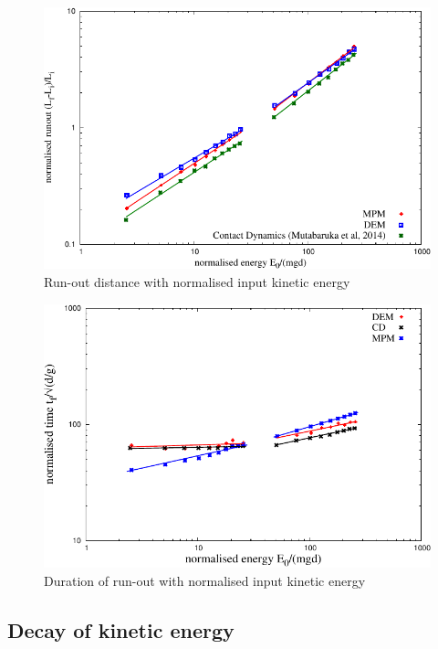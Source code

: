 \begin{figure}[tbph]
\centering
\includegraphics[width=\textwidth]{Runout_Eo_MPM_CD_DEM}
\caption{Run-out distance with normalised input kinetic energy}
\label{fig:Runout_Eo_MPM_CD_DEM}
\end{figure}

\begin{figure}[tbph]
\centering
\includegraphics[width=\textwidth]{Tf_vs_Eo_Slope}
\caption{Duration of run-out with normalised input kinetic energy}
\label{fig:Tf_vs_Eo_Slope}
\end{figure}

\subsection{Decay of kinetic energy}
\label{sec:decay}

